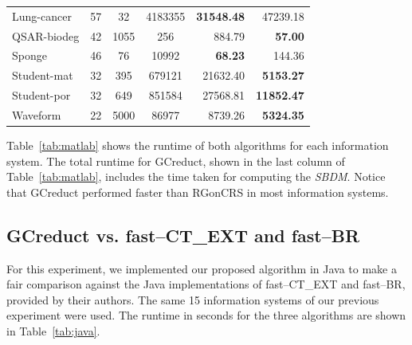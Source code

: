 \documentclass[number,preprint,review,12pt]{elsarticle}
\begin{document}
\begin{table}[!htb]
\begin{tabular}{|l|c|c|c|r|r|}
			Lung-cancer               & 57         & 32        & 4183355  & \textbf{31548.48} & 47239.18           \\
			QSAR-biodeg               & 42         & 1055      & 256      &  884.79           & \textbf{57.00}     \\
			Sponge                    & 46         & 76        & 10992    & \textbf{68.23}    & 144.36             \\
			Student-mat               & 32         & 395       & 679121   & 21632.40          & \textbf{5153.27}   \\
			Student-por               & 32         & 649       & 851584   & 27568.81          & \textbf{11852.47}  \\
			Waveform                  & 22         & 5000      & 86977    & 8739.26           & \textbf{5324.35}   \\				
			\hline
    	\end{tabular}
    \end{table}
    	
	Table~\ref{tab:matlab} shows the runtime of both algorithms for each information system. The total runtime for GCreduct, shown in the last column of Table~\ref{tab:matlab}, includes the time taken for computing the \textit{SBDM}. Notice that GCreduct performed faster than RGonCRS in most information systems.

\subsection{GCreduct vs. fast--CT\_EXT and fast--BR}\label{sub:java}
	
	For this experiment, we implemented our proposed algorithm in Java to make a fair comparison against the Java implementations of fast--CT\_EXT and fast--BR, provided by their authors. The same 15 information systems of our previous experiment were used. The runtime in seconds for the three algorithms are shown in Table~\ref{tab:java}. 
	
\end{document}
